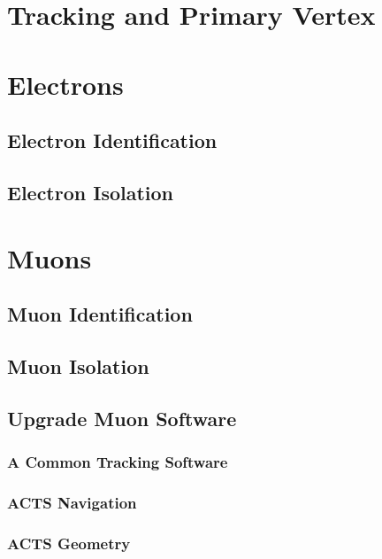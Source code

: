 \documentclass{umassthesis}          %
\begin{document}
\section{Tracking and Primary Vertex}\label{sec:reco_tracking}

\section{Electrons}\label{sec:reco_electrons}

\subsection{Electron Identification}\label{sec:reco_electron_id}

\subsection{Electron Isolation}\label{sec:reco_electron_iso}

\section{Muons}\label{sec:reco_muons}

\subsection{Muon Identification}\label{sec:reco_muon_id}

\subsection{Muon Isolation}\label{sec:reco_muon_iso}

\subsection{Upgrade Muon Software}\label{sec:reco_muon_upgrade}

\subsubsection{A Common Tracking Software}\label{sec:reco_acts}

\subsubsection{ACTS Navigation}\label{sec:reco_acts_navigation}

\subsubsection{ACTS Geometry}\label{sec:reco_acts_geometry}

\end{document}
